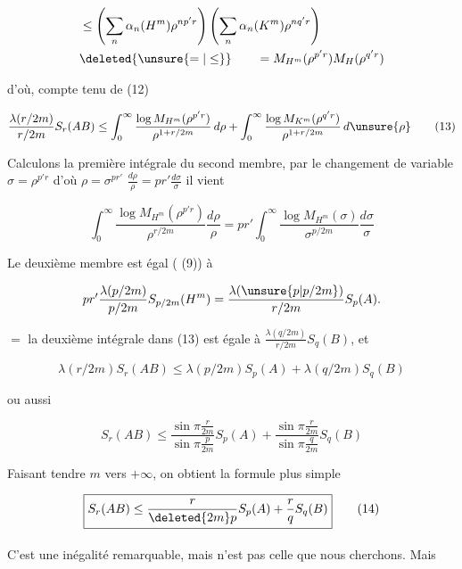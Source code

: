 \[
\begin{aligned}
&\leq\left(\sum_n\alpha_n(H^m)\rho^{np'r}\right)
\left(\sum_n\alpha_n(K^m)\rho^{nq'r}\right)\\
&\deleted{\unsure{=|\leq}}\qquad=M_{H^m}(\rho^{p'r})M_H(\rho^{q'r})
\end{aligned}
\]

d'où, compte tenu de (12)

\[
\frac{\lambda(r/2m)}{r/2m}S_r(AB)\leq
\int_0^\infty\frac{\log M_{H^m}(\rho^{p'r})}{\rho^{1+r/2m}}\,d\rho+
\int_0^\infty\frac{\log M_{K^m}(\rho^{q'r})}{\rho^{1+r/2m}}\,d\unsure{\rho}
\tag*{(13)}
\]

Calculons  la première intégrale du second membre, par le changement de variable $\sigma=\rho^{p'r}$ d'où $\rho=\sigma^{pr'}$ $\frac{d\rho}{\rho}=pr'\frac{d\sigma}{\sigma}$ il vient

\[
\int_0^\infty\frac{\log M_{H^m}(\rho^{p'r})}{\rho^{r/2m}}\frac{d\rho}{\rho}
=pr'\int_0^\infty\frac{\log M_{H^m}(\sigma)}{\sigma^{p/2m}}\frac{d\sigma}{\sigma}
\]

Le deuxième membre est égal ( (9)) à

\[
pr'\frac{\lambda(p/2m)}{p/2m}S_{p/2m}(H^m)=\frac{\lambda(\unsure{p|p/2m})}{r/2m}S_p(A).
\]

 $=$ la deuxième intégrale dans (13) est égale à $\frac{\lambda(q/2m)}{r/2m}S_q(B)$, et  

\[
\lambda(r/2m)S_r(AB)\leq\lambda(p/2m)S_p(A)+\lambda(q/2m)S_q(B)
\]

ou aussi

\[
S_r(AB)\leq\frac{\sin\pi\frac{r}{2m}}{\sin\pi\frac{p}{2m}}S_p(A)+
\frac{\sin\pi\frac{r}{2m}}{\sin\pi\frac{q}{2m}}S_q(B)
\]


Faisant tendre $m$ vers $+\infty$, on obtient la formule plus simple

\[
\boxed{S_r(AB)\leq\frac{r}{\deleted{2m}p}S_p(A)+\frac rq S_q(B)}\tag*{(14)}
\]

C'est une inégalité remarquable, mais n'est pas celle que nous cherchons. Mais \textsuperscript{}
